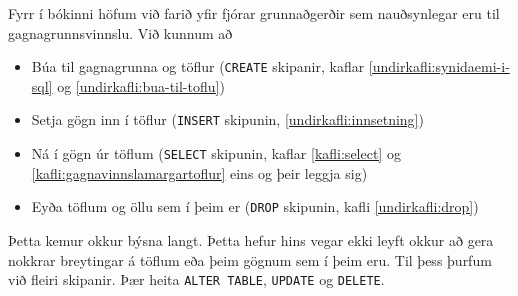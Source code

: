 Fyrr í bókinni höfum við farið yfir fjórar grunnaðgerðir sem nauðsynlegar eru til gagnagrunnsvinnslu. Við kunnum að
\begin{itemize}
 \item Búa til gagnagrunna og töflur (\verb|CREATE| skipanir, kaflar \ref{undirkafli:synidaemi-i-sql} og \ref{undirkafli:bua-til-toflu})
 \item Setja gögn inn í töflur (\verb|INSERT| skipunin, \ref{undirkafli:innsetning})
 \item Ná í gögn úr töflum (\verb|SELECT| skipunin, kaflar \ref{kafli:select} og \ref{kafli:gagnavinnslamargartoflur} eins og þeir leggja sig)
 \item Eyða töflum og öllu sem í þeim er (\verb|DROP| skipunin, kafli \ref{undirkafli:drop})
\end{itemize}
Þetta kemur okkur býsna langt. Þetta hefur hins vegar ekki leyft okkur að gera nokkrar breytingar á töflum eða þeim gögnum sem í þeim eru. Til þess þurfum við fleiri skipanir. Þær heita \verb|ALTER TABLE|, \verb|UPDATE| og \verb|DELETE|.
